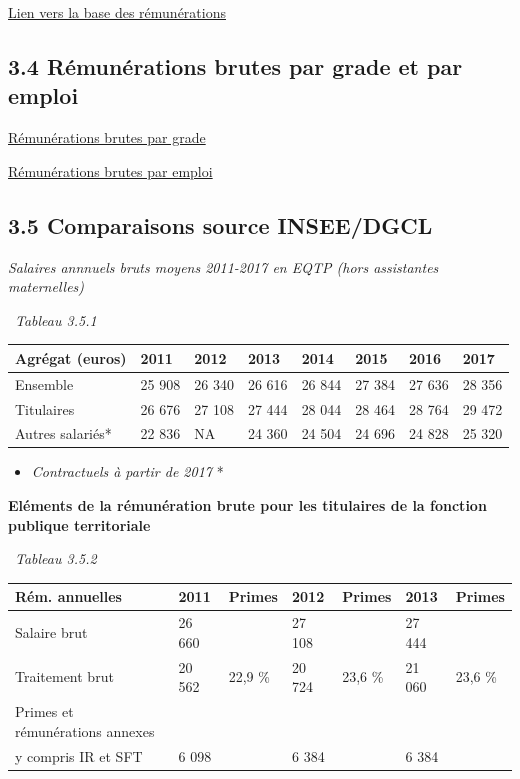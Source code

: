 \href{../Bases/Remunerations/Analyse.remunerations.csv}{Lien vers la base
des rémunérations}

\newpage

\hypertarget{remunerations-brutes-par-grade-et-par-emploi}{%
\subsection{3.4 Rémunérations brutes par grade et par
emploi}\label{remunerations-brutes-par-grade-et-par-emploi}}

\href{../Bases/Remunerations/brut.eqtp.csv}{Rémunérations brutes par grade}

\href{../Bases/Remunerations/brut.eqtp.emploi.csv}{Rémunérations brutes par
emploi}

\hypertarget{comparaisons-source-inseedgcl}{%
\subsection{3.5 Comparaisons source
INSEE/DGCL}\label{comparaisons-source-inseedgcl}}

\emph{Salaires annnuels bruts moyens 2011-2017 en EQTP (hors assistantes
maternelles)}

~\emph{Tableau 3.5.1}

\begin{longtable}[]{@{}llllllll@{}}
\toprule
Agrégat (euros) & 2011 & 2012 & 2013 & 2014 & 2015 & 2016 &
2017\tabularnewline
\midrule
\endhead
Ensemble & 25 908 & 26 340 & 26 616 & 26 844 & 27 384 & 27 636 & 28
356\tabularnewline
Titulaires & 26 676 & 27 108 & 27 444 & 28 044 & 28 464 & 28 764 & 29
472\tabularnewline
Autres salariés* & 22 836 & NA & 24 360 & 24 504 & 24 696 & 24 828 & 25
320\tabularnewline
\bottomrule
\end{longtable}

\begin{itemize}
\tightlist
\item
  \emph{Contractuels à partir de 2017} *
\end{itemize}

\textbf{Eléments de la rémunération brute pour les titulaires de la
fonction publique territoriale}

~\emph{Tableau 3.5.2}

\begin{longtable}[]{@{}lllllll@{}}
\toprule
Rém. annuelles & 2011 & Primes & 2012 & Primes & 2013 &
Primes\tabularnewline
\midrule
\endhead
Salaire brut & 26 660 & & 27 108 & & 27 444 &\tabularnewline
Traitement brut & 20 562 & 22,9 \% & 20 724 & 23,6 \% & 21 060 & 23,6
\%\tabularnewline
Primes et rémunérations annexes & & & & & &\tabularnewline
y compris IR et SFT & 6 098 & & 6 384 & & 6 384 &\tabularnewline
\bottomrule
\end{longtable}

